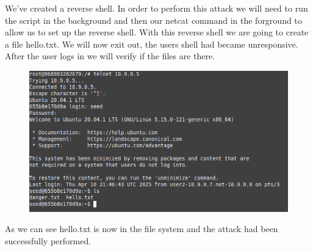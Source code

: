\documentclass[12pt]{article}
\begin{document}
We've created a reverse shell. In order to perform this attack we will need to run the script in the background and then our netcat command in the forground to allow us 
to set up the reverse shell. With this reverse shell we are going to create a file hello.txt. We will now exit out, the users shell had 
became unresponsive. After the user logs in we will verify if the files are there.

\begin{figure}[!ht]
  \includegraphics*[scale=.5]{Task4afterAttack.png}
\end{figure}

As we can see hello.txt is now in the file system and the attack had been successfully performed.
\end{document}
